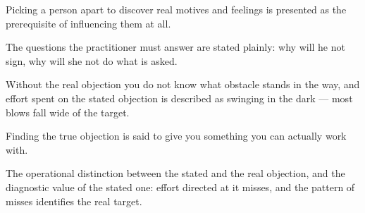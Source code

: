 

\begin{distilled}
  \item Picking a person apart to discover real motives and feelings is presented as the prerequisite of influencing them at all.
  \item The questions the practitioner must answer are stated plainly: why will he not sign, why will she not do what is asked.
  \item Without the real objection you do not know what obstacle stands in the way, and effort spent on the stated objection is described as swinging in the dark --- most blows fall wide of the target.
  \item Finding the true objection is said to give you something you can actually work with.
\end{distilled}

\begin{unique}
  \item The operational distinction between the stated and the real objection, and the diagnostic value of the stated one: effort directed at it misses, and the pattern of misses identifies the real target.
\end{unique}
